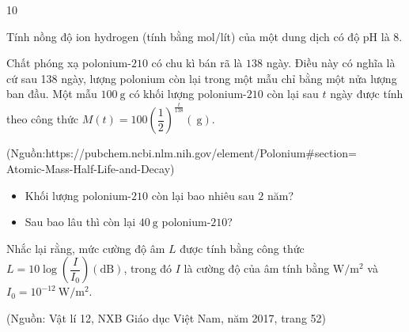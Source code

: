 \begin{indapan}{10}
\begin{bt}
	Tính nồng độ ion hydrogen (tính bằng mol/lít) của một dung dịch có độ pH là $8$.
\end{bt}

\begin{bt}
	Chất phóng xạ polonium-$210$ có chu kì bán rã là $138$ ngày. Điều này có nghĩa là cứ sau 138 ngày, lượng polonium còn lại trong một mẫu chỉ bằng một nửa lượng ban đầu. Một mẫu $100 \mathrm{~g}$ có khối lượng polonium-$210$ còn lại sau $t$ ngày được tính theo công thức $M(t)=100\left(\dfrac{1}{2}\right)^{\tfrac{t}{138}}(\mathrm{~g})$.
	\begin{flushright}
		(Nguồn:https://pubchem.ncbi.nlm.nih.gov/element/Polonium\#section=\\
		Atomic-Mass-Half-Life-and-Decay)
	\end{flushright}
	\begin{itemize}
		\item[a)] Khối lượng polonium-$210$ còn lại bao nhiêu sau $2$ năm?
		\item[b)] Sau bao lâu thì còn lại $40 \mathrm{~g}$ polonium-$210$?
	\end{itemize}
\end{bt}
\begin{bt}
	Nhắc lại rằng, mức cường độ âm $L$ được tính bằng công thức $L=10 \log \left(\dfrac{I}{I_0}\right)(\mathrm{dB})$, trong đó $I$ là cường độ của âm tính bằng $\mathrm{W}/ \mathrm{m}^2$ và $I_0=10^{-12} \mathrm{~W} / \mathrm{m}^2$.
	\begin{flushright}
		(Nguồn: Vật lí 12, NXB Giáo dục Việt Nam, năm 2017, trang 52)
	\end{flushright}
	\begin{itemize}

\end{itemize}
\end{bt}
\end{indapan}
